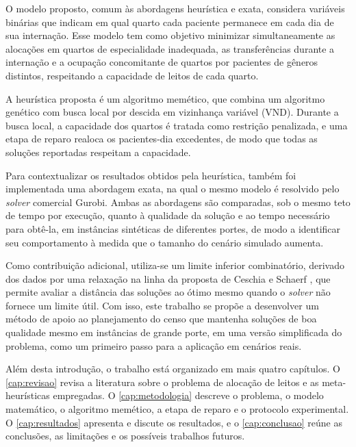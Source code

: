 O modelo proposto, comum às abordagens heurística e exata, considera variáveis binárias que indicam em qual quarto cada paciente permanece em cada dia de sua internação. Esse modelo tem como objetivo minimizar simultaneamente as alocações em quartos de especialidade inadequada, as transferências durante a internação e a ocupação concomitante de quartos por pacientes de gêneros distintos, respeitando a capacidade de leitos de cada quarto.

A heurística proposta é um algoritmo memético, que combina um algoritmo genético com busca local por descida em vizinhança variável (VND). Durante a busca local, a capacidade dos quartos é tratada como restrição penalizada, e uma etapa de reparo realoca os pacientes-dia excedentes, de modo que todas as soluções reportadas respeitam a capacidade.

Para contextualizar os resultados obtidos pela heurística, também foi implementada uma abordagem exata, na qual o mesmo modelo é resolvido pelo \textit{solver} comercial Gurobi. Ambas as abordagens são comparadas, sob o mesmo teto de tempo por execução, quanto à qualidade da solução e ao tempo necessário para obtê-la, em instâncias sintéticas de diferentes portes, de modo a identificar seu comportamento à medida que o tamanho do cenário simulado aumenta.

Como contribuição adicional, utiliza-se um limite inferior combinatório, derivado dos dados por uma relaxação na linha da proposta de Ceschia e Schaerf \cite{ceschia2011local}, que permite avaliar a distância das soluções ao ótimo mesmo quando o \textit{solver} não fornece um limite útil. Com isso, este trabalho se propõe a desenvolver um método de apoio ao planejamento do censo que mantenha soluções de boa qualidade mesmo em instâncias de grande porte, em uma versão simplificada do problema, como um primeiro passo para a aplicação em cenários reais.

Além desta introdução, o trabalho está organizado em mais quatro capítulos. O \autoref{cap:revisao} revisa a literatura sobre o problema de alocação de leitos e as meta-heurísticas empregadas. O \autoref{cap:metodologia} descreve o problema, o modelo matemático, o algoritmo memético, a etapa de reparo e o protocolo experimental. O \autoref{cap:resultados} apresenta e discute os resultados, e o \autoref{cap:conclusao} reúne as conclusões, as limitações e os possíveis trabalhos futuros.
